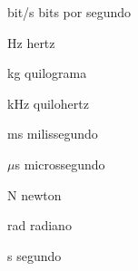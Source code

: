 \renewcommand{\listadesiglasname}{LISTA DE ABREVIATURAS}
\begin{siglas}
 \item[bit/s] bits por segundo
 \item[Hz] hertz
 \item[kg] quilograma
 \item[kHz] quilohertz
 \item[ms] milissegundo
 \item[$\mu$s] microssegundo
 \item[N] newton
 \item[rad] radiano
 \item[s] segundo
\end{siglas}
